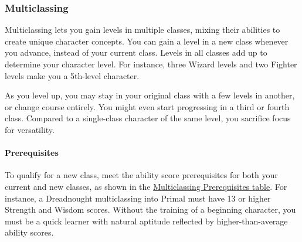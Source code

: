 \subsubsection{Multiclassing}\label{_multiclassing}

Multiclassing lets you gain levels in multiple classes, mixing their
abilities to create unique character concepts. You can gain a level in a
new class whenever you advance, instead of your current class. Levels in
all classes add up to determine your character level. For instance,
three Wizard levels and two Fighter levels make you a 5th-level
character.

As you level up, you may stay in your original class with a few levels
in another, or change course entirely. You might even start progressing
in a third or fourth class. Compared to a single-class character of the
same level, you sacrifice focus for versatility.

\paragraph{Prerequisites}\label{_prerequisites}

To qualify for a new class, meet the ability score prerequisites for
both your current and new classes, as shown in the
\hyperref[multiclassing-prerequisites-table]{Multiclassing Prerequisites
table}. For instance, a Dreadnought multiclassing into Primal must have
13 or higher Strength and Wisdom scores. Without the training of a
beginning character, you must be a quick learner with natural aptitude
reflected by higher-than-average ability scores.

